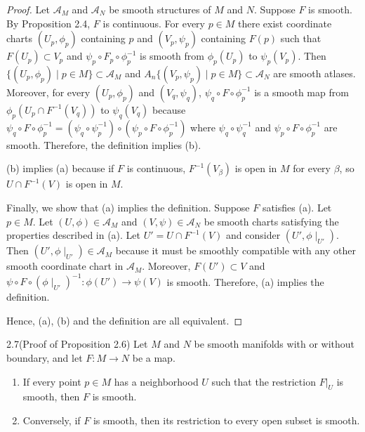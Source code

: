 \begin{proof}
  Let $\mathcal{A}_M$ and $\mathcal{A}_N$ be smooth structures of $M$ and $N$.
  Suppose $F$ is smooth.
  By Proposition 2.4, $F$ is continuous.
  For every $p \in M$ there exist coordinate charts $(U_p, \phi_p)$ containing $p$ and $(V_p, \psi_p)$ containing $F(p)$ such that $F(U_p) \subset V_p$ and $\psi_p \circ F_p \circ \phi_p^{-1}$ is smooth from $\phi_p(U_p)$ to $\psi_p(V_p)$.
  Then $\{ (U_p, \phi_p) \mid p \in M \} \subset \mathcal{A}_M$ and $A_n \{ (V_p, \psi_p) \mid p \in M \} \subset \mathcal{A}_N$ are smooth atlases.
  Moreover, for every $(U_p, \phi_p)$ and $(V_q, \psi_q)$, $\psi_q \circ F \circ \phi_p^{-1}$ is a smooth map from $\phi_p(U_p \cap F^{-1}(V_q))$ to $\psi_q(V_q)$ because $\psi_q \circ F \circ \phi^{-1}_p = (\psi_q \circ \psi_p^{-1}) \circ (\psi_p \circ F \circ \phi_p^{-1})$ where $\psi_q \circ \psi_q^{-1}$ and $\psi_p \circ F \circ \phi_p^{-1}$ are smooth.
  Therefore, the definition implies (b).

  (b) implies (a) because if $F$ is continuous, $F^{-1}(V_{\beta})$ is open in $M$ for every $\beta$, so $U \cap F^{-1}(V)$ is open in $M$.

  Finally, we show that (a) implies the definition.
  Suppose $F$ satisfies (a).
  Let $p \in M$.
  Let $(U, \phi) \in \mathcal{A}_M$ and $(V, \psi) \in \mathcal{A}_N$ be smooth charts satisfying the properties described in (a).
  Let $U' = U \cap F^{-1}(V)$ and consider $(U', \phi\mid_{U'})$.
  Then $(U', \phi\mid_{U'}) \in \mathcal{A}_M$ because it must be smoothly compatible with any other smooth coordinate chart in $\mathcal{A}_M$.
  Moreover, $F(U') \subset V$ and $\psi \circ F \circ (\phi\mid_{U'})^{-1}:\phi(U') \rightarrow \psi(V)$ is smooth.
  Therefore, (a) implies the definition.

  Hence, (a), (b) and the definition are all equivalent.
\end{proof}

\begin{customexer}{2.7(Proof of Proposition 2.6)}\label{exercise_2_7}
  Let $M$ and $N$ be smooth manifolds with or without boundary, and let $F: M \rightarrow N$ be a map.
  \begin{enumerate}[label=(\alph*)]
    \item 
      If every point $p \in M$ has a neighborhood $U$ such that the restriction $F\vert_U$ is smooth, then $F$ is smooth.
    \item
      Conversely, if $F$ is smooth, then its restriction to every open subset is smooth.
  \end{enumerate}
\end{customexer}

